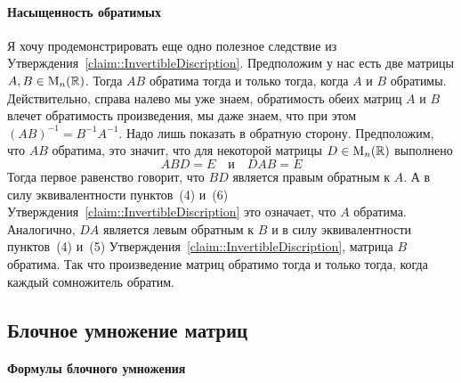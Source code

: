 \paragraph{Насыщенность обратимых}

Я хочу продемонстрировать еще одно полезное следствие из Утверждения~\ref{claim::InvertibleDiscription}.
Предположим у нас есть две матрицы $A, B\in \operatorname{M}_{n}(\mathbb R)$.
Тогда $AB$ обратима тогда и только тогда, когда $A$ и $B$ обратимы.
Действительно, справа налево мы уже знаем, обратимость обеих матриц $A$ и $B$ влечет обратимость произведения, мы даже знаем, что при этом $(AB)^{-1} = B^{-1}A^{-1}$.
Надо лишь показать в обратную сторону.
Предположим, что $AB$ обратима, это значит, что для некоторой матрицы $D\in \operatorname{M}_{n}(\mathbb R)$ выполнено
\[
ABD = E\quad\text{и}\quad DAB = E
\]
Тогда первое равенство говорит, что $BD$ является правым обратным к $A$.
А в силу эквивалентности пунктов~(4) и~(6) Утверждения~\ref{claim::InvertibleDiscription} это означает, что $A$ обратима.
Аналогично, $DA$ является левым обратным к $B$ и в силу эквивалентности пунктов~(4) и~(5) Утверждения~\ref{claim::InvertibleDiscription}, матрица $B$ обратима.
Так что произведение матриц обратимо тогда и только тогда, когда каждый сомножитель обратим.

\subsection{Блочное умножение матриц}

\paragraph{Формулы блочного умножения}

